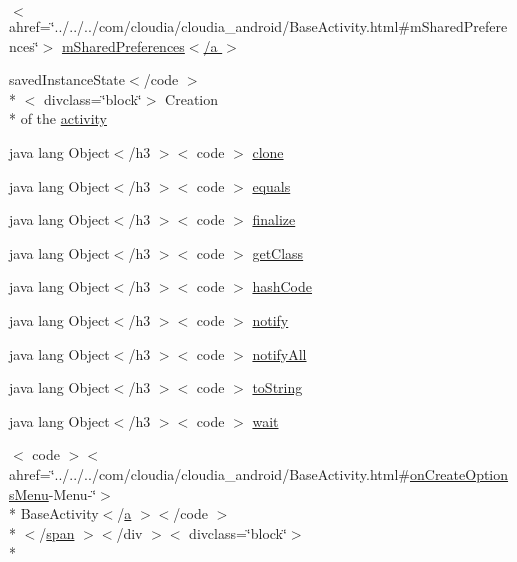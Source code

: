 \begin{DoxyCompactItemize}
$<$ ahref=\char`\"{}../../../com/cloudia/cloudia\-\_\-android/Base\-Activity.\-html\#m\-Shared\-Preferences\char`\"{}$>$ \hyperlink{_sensor_activity_8html_a5b7f2b6398d46c2bac3442c34be02d25}{m\-Shared\-Preferences$<$/a $>$}
\item 
saved\-Instance\-State$<$/code $>$\\*
$<$ divclass=\char`\"{}block\char`\"{}$>$ Creation \\*
of the \hyperlink{_sensor_activity_8html_a27ce96cb0fb53311961cb30579c7f77e}{activity}
\item 
java lang Object$<$/h3 $>$$<$ code $>$ \hyperlink{_sensor_activity_8html_adc9607fcabf6f2d7f401ad52015ef6e0}{clone}
\item 
java lang Object$<$/h3 $>$$<$ code $>$ \hyperlink{_sensor_activity_8html_a8974318cea585f72df717e0380ec7104}{equals}
\item 
java lang Object$<$/h3 $>$$<$ code $>$ \hyperlink{_sensor_activity_8html_ab2315181ead4aeedef2374039b6ddde7}{finalize}
\item 
java lang Object$<$/h3 $>$$<$ code $>$ \hyperlink{_sensor_activity_8html_a98e6644727fe65eac217a6855045be43}{get\-Class}
\item 
java lang Object$<$/h3 $>$$<$ code $>$ \hyperlink{_sensor_activity_8html_a8e178e2bb2bef055ea23ea3910a221ca}{hash\-Code}
\item 
java lang Object$<$/h3 $>$$<$ code $>$ \hyperlink{_sensor_activity_8html_ae99ae10b5010594dbda4794e02db271b}{notify}
\item 
java lang Object$<$/h3 $>$$<$ code $>$ \hyperlink{_sensor_activity_8html_a1279357e6e09e33e75b55eb05fdb6436}{notify\-All}
\item 
java lang Object$<$/h3 $>$$<$ code $>$ \hyperlink{_sensor_activity_8html_a36e8a76a4132c9a7081416f27d087615}{to\-String}
\item 
java lang Object$<$/h3 $>$$<$ code $>$ \hyperlink{_sensor_activity_8html_a9a9f0c22e5688d478c707f910f1c1aea}{wait}
\item 
$<$ code $>$$<$ ahref=\char`\"{}../../../com/cloudia/cloudia\-\_\-android/Base\-Activity.\-html\#\hyperlink{index-13_8html_a96b77eefe935dd33e8be2f1a26fcd2b6}{on\-Create\-Options\-Menu}-\/Menu-\/\char`\"{}$>$\\*
 Base\-Activity$<$/\hyperlink{style_8css_a5e8981582017bb8b84c21f148345d1f7}{a} $>$$<$/code $>$\\*
$<$/\hyperlink{stylesheet_8css_a8343996ebcf16220b04e54659aac31cc}{span} $>$$<$/div $>$$<$ divclass=\char`\"{}block\char`\"{}$>$\\*
$$
\end{DoxyCompactItemize}
